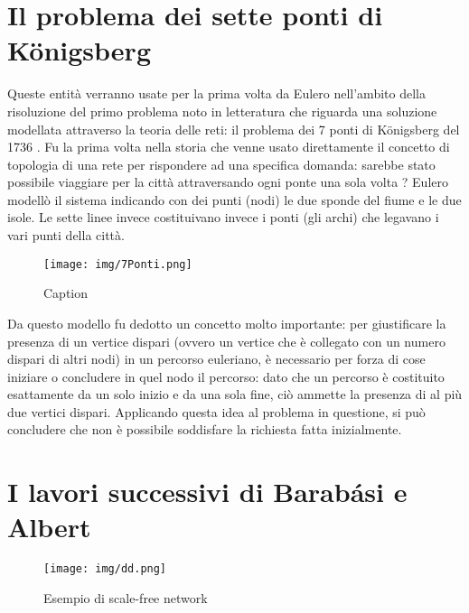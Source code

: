 \documentclass[12pt,twoside]{report}
\begin{document}
	\section{Il problema dei sette ponti di Königsberg}
	Queste entità verranno usate per la prima volta da Eulero nell'ambito della risoluzione del primo problema noto in letteratura che riguarda una soluzione modellata attraverso la teoria delle reti: il problema dei 7 ponti di Königsberg del 1736 \cite{https://doi.org/10.1002/jgt.3190100305}.
	\FloatBarrier
	Fu la prima volta nella storia che venne usato direttamente il concetto di topologia di una rete per rispondere ad una specifica domanda: sarebbe stato possibile viaggiare per la città attraversando ogni ponte una sola volta ?
	Eulero modellò il sistema indicando con dei punti (nodi) le due sponde del fiume e le due isole. Le sette linee invece costituivano invece i ponti (gli archi) che legavano i vari punti della città.
	\begin{figure}
	    \centering
	    \texttt{[image: img/7Ponti.png]}
	    \caption{Caption}
	    \label{fig:my_label}
	\end{figure}
	Da questo modello fu dedotto un concetto molto importante: per giustificare la presenza di un vertice dispari (ovvero un vertice che è collegato con un numero dispari di altri nodi) in un percorso euleriano, è necessario per forza di cose iniziare o concludere in quel nodo il percorso: dato che un percorso è costituito esattamente da un solo inizio e da una sola fine, ciò ammette la presenza di al più due vertici dispari. Applicando questa idea al problema in questione, si può concludere che non è possibile soddisfare la richiesta fatta inizialmente.\clearpage
	\FloatBarrier
	\section{I lavori successivi di Barabási e Albert}
	
	\begin{figure}[h]
	    \centering
	    \texttt{[image: img/dd.png]}
	    \caption{Esempio di scale-free network}
	    \label{fig:my_label}
	\end{figure}
	
\end{document}
